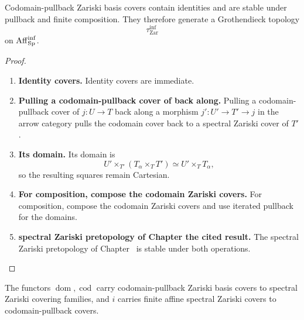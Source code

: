 \begin{proposition}
\label{prop:infinitesimal-zariski-pretopology}
Codomain-pullback Zariski basis covers contain identities and are stable under
pullback and finite composition. They therefore generate a Grothendieck
topology
\[
    \tau^{\inf}_{\mathrm{Zar}}
\]
on \(\operatorname{Aff}_{\operatorname{Sp}}^{\inf}\).
\end{proposition}

\begin{proof}
\leavevmode
\begin{enumerate}[label=\textup{(\arabic*)}]
    \item \textbf{Identity covers.}
    Identity covers are immediate.

    \item \textbf{Pulling a codomain-pullback cover of back along.}
    Pulling a codomain-pullback cover of \(j:U\to T\) back along a morphism \(j':U'\to T'\to j\) in the
    arrow category pulls the codomain cover back to a spectral Zariski cover of \(T'\).

    \item \textbf{Its domain.}
    Its domain is
    \[
        U'\times_{T'}(T_\alpha\times_TT')
        \simeq
        U'\times_TT_\alpha,
    \]
    so the resulting squares remain Cartesian.

    \item \textbf{For composition, compose the codomain Zariski covers.}
    For composition, compose the codomain Zariski covers and use iterated pullback for the
    domains.

    \item \textbf{spectral Zariski pretopology of Chapter the cited result.}
    The spectral Zariski pretopology of Chapter~ is stable
    under both operations.
\end{enumerate}
\end{proof}

\begin{proposition}
\label{prop:infinitesimal-endpoint-continuity}
The functors \(\operatorname{dom},\operatorname{cod}\) carry codomain-pullback Zariski basis covers to spectral
Zariski covering families, and \(i\) carries finite affine spectral Zariski
covers to codomain-pullback covers.
\end{proposition}

